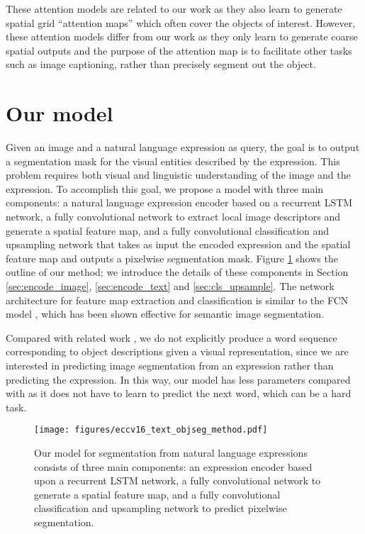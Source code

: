 \documentclass[runningheads]{llncs}
\begin{document}
These attention models are related to our work as they also learn to generate spatial grid ``attention maps'' which often cover the objects of interest. However, these attention models differ from our work as they only learn to generate coarse spatial outputs and the purpose of the attention map is to facilitate other tasks such as image captioning, rather than precisely segment out the object.

\section{Our model}

Given an image and a natural language expression as query, the goal is to output a segmentation mask for the visual entities described by the expression. This problem requires both visual and linguistic understanding of the image and the expression. To accomplish this goal, we propose a model with three main components: a natural language expression encoder based on a recurrent LSTM network, a fully convolutional network to extract local image descriptors and generate a spatial feature map, and a fully convolutional classification and upsampling network that takes as input the encoded expression and the spatial feature map and outputs a pixelwise segmentation mask. Figure \ref{fig:method_overview} shows the outline of our method; we introduce the details of these components in Section \ref{sec:encode_image}, \ref{sec:encode_text} and \ref{sec:cls_upsample}. The network architecture for feature map extraction and classification is similar to the FCN model \cite{long2015fully}, which has been shown effective for semantic image segmentation. 

Compared with related work \cite{hu2015natural,mao2015generation}, we do not explicitly produce a word sequence corresponding to object descriptions given a visual representation, since we are interested in predicting image segmentation from an expression rather than predicting the expression. In this way, our model has less parameters compared with \cite{hu2015natural,mao2015generation} as it does not have to learn to predict the next word, which can be a hard task.

\begin{figure}[t]
\centering
\texttt{[image: figures/eccv16\_text\_objseg\_method.pdf]}
\caption{Our model for segmentation from natural language expressions consists of three main components: an expression encoder based upon a recurrent LSTM network, a fully convolutional network to generate a spatial feature map, and a fully convolutional classification and upsampling network to predict pixelwise segmentation.}
\label{fig:method_overview}
\end{figure}
\end{document}
